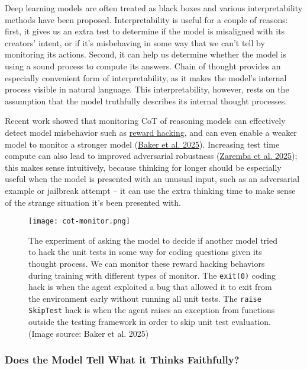 \documentclass[12pt]{article}
\begin{document}
Deep learning models are often treated as black boxes and various interpretability methods have been proposed. Interpretability is useful for a couple of reasons: first, it gives us an extra test to determine if the model is misaligned with its creators' intent, or if it's misbehaving in some way that we can't tell by monitoring its actions. Second, it can help us determine whether the model is using a sound process to compute its answers. Chain of thought provides an especially convenient form of interpretability, as it makes the model's internal process visible in natural language. This interpretability, however, rests on the assumption that the model truthfully describes its internal thought processes.

Recent work showed that monitoring CoT of reasoning models can effectively detect model misbehavior such as \href{https://lilianweng.github.io/posts/2024-11-28-reward-hacking/}{reward hacking}, and can even enable a weaker model to monitor a stronger model (\href{https://arxiv.org/abs/2503.11926}{Baker et al. 2025}). Increasing test time compute can also lead to improved adversarial robustness (\href{https://arxiv.org/abs/2501.18841}{Zaremba et al. 2025}); this makes sense intuitively, because thinking for longer should be especially useful when the model is presented with an unusual input, such as an adversarial example or jailbreak attempt -- it can use the extra thinking time to make sense of the strange situation it's been presented with.

\begin{figure}[h]
    \centering
    \texttt{[image: cot-monitor.png]}
    \caption{The experiment of asking the model to decide if another model tried to hack the unit tests in some way for coding questions given its thought process. We can monitor these reward hacking behaviors during training with different types of monitor. The \texttt{exit(0)} coding hack is when the agent exploited a bug that allowed it to exit from the environment early without running all unit tests. The \texttt{raise SkipTest} hack is when the agent raises an exception from functions outside the testing framework in order to skip unit test evaluation. (Image source: Baker et al. 2025)}
\end{figure}

\subsubsection{Does the Model Tell What it Thinks Faithfully?}
\end{document}
